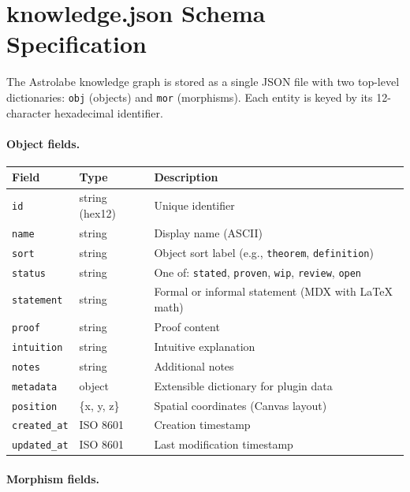 \section{knowledge.json Schema Specification}
\label{sec:app-schema}


The Astrolabe knowledge graph is stored as a single JSON file with two top-level dictionaries: \texttt{obj} (objects) and \texttt{mor} (morphisms). Each entity is keyed by its 12-character hexadecimal identifier.

\paragraph{Object fields.}

\begin{table}[h]
\centering
\small
\begin{tabular}{llp{7cm}}
\toprule
Field & Type & Description \\
\midrule
\texttt{id}         & string (hex12)  & Unique identifier \\
\texttt{name}       & string          & Display name (ASCII) \\
\texttt{sort}       & string          & Object sort label (e.g., \texttt{theorem}, \texttt{definition}) \\
\texttt{status}     & string          & One of: \texttt{stated}, \texttt{proven}, \texttt{wip}, \texttt{review}, \texttt{open} \\
\texttt{statement}  & string          & Formal or informal statement (MDX with \LaTeX{} math) \\
\texttt{proof}      & string          & Proof content \\
\texttt{intuition}  & string          & Intuitive explanation \\
\texttt{notes}      & string          & Additional notes \\
\texttt{metadata}   & object          & Extensible dictionary for plugin data \\
\texttt{position}   & \{x, y, z\}    & Spatial coordinates (Canvas layout) \\
\texttt{created\_at} & ISO 8601       & Creation timestamp \\
\texttt{updated\_at} & ISO 8601       & Last modification timestamp \\
\bottomrule
\end{tabular}
\end{table}

\paragraph{Morphism fields.}

